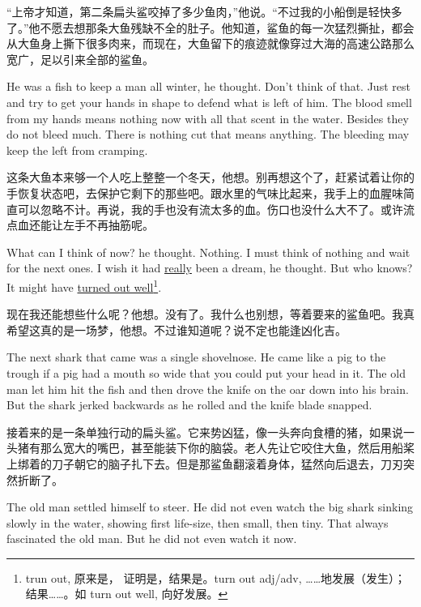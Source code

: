 \begin{paracol}{2}
\switchcolumn

“上帝才知道，第二条扁头鲨咬掉了多少鱼肉，”他说。“不过我的小船倒是轻快多了。”他不愿去想那条大鱼残缺不全的肚子。他知道，鲨鱼的每一次猛烈撕扯，都会从大鱼身上撕下很多肉来，而现在，大鱼留下的痕迹就像穿过大海的高速公路那么宽广，足以引来全部的鲨鱼。

\switchcolumn*

He was a fish to keep a man all winter, he thought. Don't think of that.
Just rest and try to get your hands in shape to defend what is left of him.
The blood smell from my hands means nothing now with all that scent in the
water. Besides they do not bleed much. There is nothing cut that means
anything. The bleeding may keep the left from cramping.

\switchcolumn

这条大鱼本来够一个人吃上整整一个冬天，他想。别再想这个了，赶紧试着让你的手恢复状态吧，去保护它剩下的那些吧。跟水里的气味比起来，我手上的血腥味简直可以忽略不计。再说，我的手也没有流太多的血。伤口也没什么大不了。或许流点血还能让左手不再抽筋呢。

\switchcolumn*

What can I think of now? he thought. Nothing. I must think of nothing and
wait for the next ones. I wish it had \uline{really} been a dream, he thought.
But who knows? It might have \uline{turned out well}\footnote{trun out, 原来是，
  证明是，结果是。turn out adj/adv, ……地发展（发生）；结果……。如 turn
  out well, 向好发展。}.

\switchcolumn

现在我还能想些什么呢？他想。没有了。我什么也别想，等着要来的鲨鱼吧。我真希望这真的是一场梦，他想。不过谁知道呢？说不定也能逢凶化吉。

\switchcolumn*

The next shark that came was a single shovelnose. He came like a pig to the
trough if a pig had a mouth so wide that you could put your head in it. The
old man let him hit the fish and then drove the knife on the oar down into
his brain. But the shark jerked backwards as he rolled and the knife blade
snapped.

\switchcolumn

接着来的是一条单独行动的扁头鲨。它来势凶猛，像一头奔向食槽的猪，如果说一头猪有那么宽大的嘴巴，甚至能装下你的脑袋。老人先让它咬住大鱼，然后用船桨上绑着的刀子朝它的脑子扎下去。但是那鲨鱼翻滚着身体，猛然向后退去，刀刃突然折断了。

\switchcolumn*

The old man settled himself to steer. He did not even watch the big shark
sinking slowly in the water, showing first \gls{life-size}, then small, then
tiny. That always \gls{fascinated} the old man. But he did not even watch it now.


\end{paracol}
